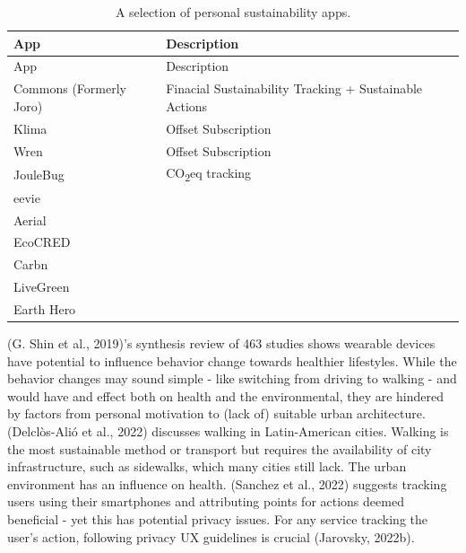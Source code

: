 \documentclass[
  12pt,
  letterpaper,
  DIV=11,
  numbers=noendperiod]{scrartcl}
\begin{document}
\begin{longtable}[]{@{}
  >{\raggedright\arraybackslash}p{}
  >{\raggedright\arraybackslash}p{}@{}}
\caption[A Selection of Personal Sustainability Apps]{A selection of
personal sustainability apps.}\tabularnewline
\toprule\noalign{}
\begin{minipage}[b]{\linewidth}\raggedright
App
\end{minipage} & \begin{minipage}[b]{\linewidth}\raggedright
Description
\end{minipage} \\
\midrule\noalign{}
\endfirsthead
\toprule\noalign{}
\begin{minipage}[b]{\linewidth}\raggedright
App
\end{minipage} & \begin{minipage}[b]{\linewidth}\raggedright
Description
\end{minipage} \\
\midrule\noalign{}
\endhead
\bottomrule\noalign{}
\endlastfoot
Commons (Formerly Joro) & Finacial Sustainability Tracking + Sustainable
Actions \\
Klima & Offset Subscription \\
Wren & Offset Subscription \\
JouleBug & CO\textsubscript{2}eq tracking \\
eevie & \\
Aerial & \\
EcoCRED & \\
Carbn & \\
LiveGreen & \\
Earth Hero & \\
\end{longtable}

\let\pandoctableshortcapt\relax

(G. Shin et al., 2019)'s synthesis review of 463 studies shows wearable
devices have potential to influence behavior change towards healthier
lifestyles. While the behavior changes may sound simple - like switching
from driving to walking - and would have and effect both on health and
the environmental, they are hindered by factors from personal motivation
to (lack of) suitable urban architecture. (Delclòs-Alió et al., 2022)
discusses walking in Latin-American cities. Walking is the most
sustainable method or transport but requires the availability of city
infrastructure, such as sidewalks, which many cities still lack. The
urban environment has an influence on health. (Sanchez et al., 2022)
suggests tracking users using their smartphones and attributing points
for actions deemed beneficial - yet this has potential privacy issues.
For any service tracking the user's action, following privacy UX
guidelines is crucial (Jarovsky, 2022b).
\end{document}

